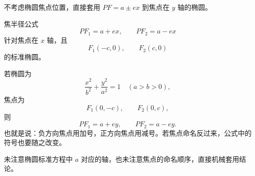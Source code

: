\begin{trapbox}
	\medskip
	\begin{description}[style=nextline, leftmargin=2.8em, labelsep=0.5em, itemsep=0.35em]
		\item[\textbf{\textcolor{CTrap}{易错点四（公式前提遗忘）}}] 不考虑椭圆焦点位置，直接套用 $PF=a\pm ex$ 到焦点在 $y$ 轴的椭圆。
		\item[\textbf{\textcolor{CTrap}{正确理解（焦点轴判断）：}}] 焦半径公式
		      \[
			      PF_1=a+ex,\qquad PF_2=a-ex
		      \]
		      针对焦点在 $x$ 轴，且
		      \[
			      F_1(-c,0),\qquad F_2(c,0)
		      \]
		      的标准椭圆。

		      若椭圆为
		      \[
			      \frac{x^2}{b^2}+\frac{y^2}{a^2}=1\quad (a>b>0),
		      \]
		      焦点为
		      \[
			      F_1(0,-c),\qquad F_2(0,c),
		      \]
		      则
		      \[
			      PF_1=a+ey,\qquad PF_2=a-ey.
		      \]
		      也就是说：负方向焦点用加号，正方向焦点用减号。若焦点命名反过来，公式中的符号也要随之改变。
		\item[\textbf{\textcolor{CTrap}{错因分析（标准方程误用）：}}] 未注意椭圆标准方程中 $a$ 对应的轴，也未注意焦点的命名顺序，直接机械套用结论。
	\end{description}
\end{trapbox}